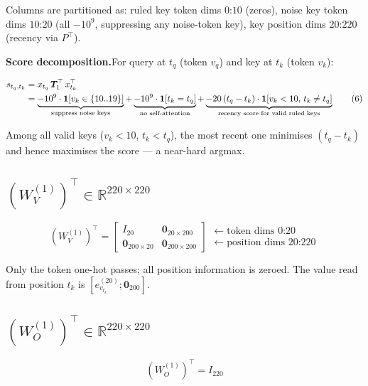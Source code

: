 \documentclass[11pt]{article}
\newcommand{\R}{\mathbb{R}}
\begin{document}
Columns are partitioned as: ruled key token dims $0$:$10$ (zeros), noise key token dims $10$:$20$
(all $-10^9$, suppressing any noise-token key), key position dims $20$:$220$ (recency via
$P^\top$).

\medskip
\textbf{Score decomposition.}\quad For query at $t_q$ (token $v_q$) and key at $t_k$ (token $v_k$):

\begin{align}
s_{t_q,t_k}
&= x_{t_q}\,\boldsymbol{T}_1^\top\,x_{t_k}^\top\notag\\
&= \underbrace{-10^9\cdot\mathbf{1}[v_k\in\{10\text{..}19\}]}_{\text{suppress noise keys}}
  +\underbrace{-10^9\cdot\mathbf{1}[t_k=t_q]}_{\text{no self-attention}}
  +\underbrace{-20\,(t_q-t_k)\cdot\mathbf{1}[v_k<10,\,t_k\neq t_q]}_{\text{recency score for valid ruled keys}}
\tag{6}
\end{align}

Among all valid keys ($v_k<10$, $t_k<t_q$), the most recent one minimises $(t_q-t_k)$ and hence
maximises the score --- a near-hard argmax.

\subsection{$(W_V^{(1)})^\top\in\R^{220\times220}$}

\begin{equation}
\boxed{
(W_V^{(1)})^\top=\begin{bmatrix}I_{20} & \mathbf{0}_{20\times200}\\
\mathbf{0}_{200\times20} & \mathbf{0}_{200\times200}\end{bmatrix}
}
\begin{array}{l}\leftarrow\text{token dims }0\text{:}20\\\leftarrow\text{position dims }20\text{:}220\end{array}
\tag{7}
\end{equation}

Only the token one-hot passes; all position information is zeroed. The value read from position $t_k$
is $[e_{v_{t_k}}^{(20)};\mathbf{0}_{200}]$.

\subsection{$(W_O^{(1)})^\top\in\R^{220\times220}$}

\begin{equation}
\boxed{(W_O^{(1)})^\top=I_{220}}
\tag{8}
\end{equation}
\end{document}
